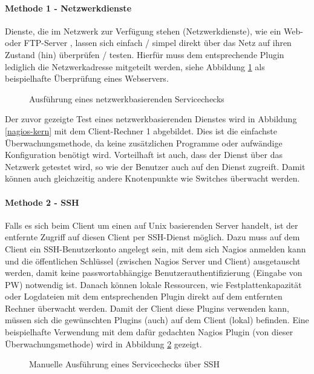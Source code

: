 \paragraph{Methode 1 - Netzwerkdienste}

Dienste, die im Netzwerk zur Verfügung stehen (Netzwerkdienste), wie ein Web- oder \gls{FTP}-Server , lassen sich einfach / simpel direkt über das Netz auf ihren Zustand (hin) überprüfen /  testen.
Hierfür muss dem entsprechende Plugin lediglich die Netzwerkadresse mitgeteilt werden, siehe Abbildung \ref{check-http} als beispielhafte Überprüfung eines Webservers.
\begin{figure}[ht]  
	\centering
		\caption{Ausführung eines netzwerkbasierenden Servicechecks}
		\label{check-http}
\end{figure}
Der zuvor gezeigte Test eines netzwerkbasierenden Dienstes wird in Abbildung \ref{nagios-kern} mit dem Client-Rechner 1 abgebildet.
Dies ist die einfachste Überwachungsmethode, da keine zusätzlichen Programme oder aufwändige Konfiguration benötigt wird.
Vorteilhaft ist auch, dass der Dienst über das Netzwerk getestet wird, so wie der Benutzer auch auf den Dienst zugreift.
Damit können auch gleichzeitig andere Knotenpunkte wie Switches überwacht werden.

\paragraph{Methode 2 - SSH}
Falls es sich beim Client um einen auf Unix basierenden Server handelt, ist der entfernte Zugriff auf diesen Client per \gls{SSH}-Dienst möglich.
Dazu muss auf dem Client ein \gls{SSH}-Benutzerkonto angelegt sein, mit dem sich Nagios anmelden kann und die öffentlichen Schlüssel (zwischen Nagios Server und Client) ausgetauscht werden, damit keine passwortabhängige Benutzerauthentifizierung (Eingabe von PW) notwendig ist.
Danach können lokale Ressourcen, wie Festplattenkapazität oder Logdateien mit dem entsprechenden Plugin direkt auf dem entfernten Rechner überwacht werden.
Damit der Client diese Plugins verwenden kann, müssen sich die gewünschten Plugins (auch) auf dem Client (lokal) befinden.
Eine beispielhafte Verwendung mit dem dafür gedachten Nagios Plugin  (von dieser Überwachungsmethode) wird in Abbildung \ref{check-ssh} gezeigt.
\begin{figure}[ht]
	\centering
		\caption{Manuelle Ausführung eines Servicechecks über SSH}
		\label{check-ssh}
\end{figure}

